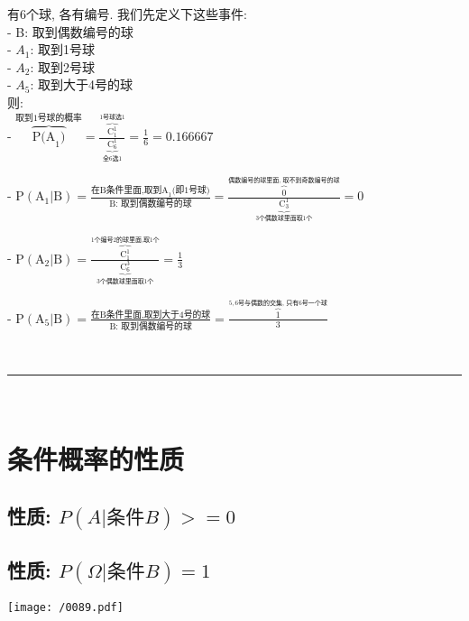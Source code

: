 \documentclass[UTF8]{ctexart}
\begin{document}
	\begin{myEnvSample}
		有6个球, 各有编号.  我们先定义下这些事件: \\
		- B: 取到偶数编号的球 \\
		- $A_1$: 取到1号球 \\
		- $A_2$: 取到2号球 \\
		- $A_5$: 取到大于4号的球 \\
		
		则: \\
		- $
		\overset{\text{取到1号球的概率}}{\overbrace{\text{P(A}_1\text{)}}}=\frac{\overset{1\text{号球选}1}{\overbrace{\text{C}_{1}^{1}}}}{\underset{\text{全6选}1}{\underbrace{\text{C}_{6}^{1}}}}=\frac{1}{6}=0.166667
		$
		
		- $
		\text{P}\left( \text{A}_1|\text{B} \right) =\frac{\text{在B条件里面,取到A}_1\text{(即1号球)}}{\text{B:\ 取到偶数编号的球}}=\frac{\overset{\text{偶数编号的球里面,\ 取不到奇数编号的球}}{\overbrace{0}}}{\underset{3\text{个偶数球里面取1个}}{\underbrace{\text{C}_{3}^{1}}}}=0
		$
		
		- $
		\text{P}\left( \text{A}_2|\text{B} \right) =\frac{\overset{1\text{个编号2的球里面,取1个}}{\overbrace{\text{C}_{1}^{1}}}}{\underset{3\text{个偶数球里面取1个}}{\underbrace{\text{C}_{6}^{3}}}}=\frac{1}{3}
		$
		
		- $
		\text{P}\left( \text{A}_5|\text{B} \right) =\frac{\text{在B条件里面,取到大于4号的球}}{\text{B:\ 取到偶数编号的球}}=\frac{\overset{5,6\text{号与偶数的交集,\ 只有6号一个球}}{\overbrace{1}}}{3}
		$
			
	\end{myEnvSample}
	
	
	~\\
	\hrule
	~\\
	
	
	\section{条件概率的性质}
	
	\subsection{性质: $ P(A | \text{条件}B) >= 0$}
	
	
	\subsection{性质: $ P(\Omega | \text{条件}B) = 1$}
	
	\texttt{[image: /0089.pdf]}
	
\end{document}
